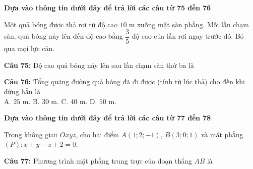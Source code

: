 \documentclass[12pt,a4paper]{article}
\begin{document}


\vspace{0.5cm}
\noindent\textbf{Dựa vào thông tin dưới đây để trả lời các câu từ 75 đến 76}%


\par\nobreak

Một quả bóng được thả rơi từ độ cao $10$ m xuống mặt sàn phẳng. Mỗi lần chạm sàn, quả bóng nảy lên đến độ cao bằng $\dfrac35$ độ cao của lần rơi ngay trước đó. Bỏ qua mọi lực cản.

\par\nobreak


\noindent \textbf{Câu 75:} Độ cao quả bóng nảy lên sau lần chạm sàn thứ ba là\\
\noindent{}



\vspace{0.3cm}

\noindent \textbf{Câu 76:} Tổng quãng đường quả bóng đã đi được (tính từ lúc thả) cho đến khi dừng hẳn là\\
\noindent A. $25$ m. \hfill B. $30$ m. \hfill C. $40$ m. \hfill D. $50$ m.



\vspace{0.5cm}
\noindent\textbf{Dựa vào thông tin dưới đây để trả lời các câu từ 77 đến 78}%


\par\nobreak

Trong không gian $Oxyz$, cho hai điểm $A(1;2;-1)$, $B(3;0;1)$ và mặt phẳng $(P)\colon x+y-z+2=0$.

\par\nobreak


\noindent \textbf{Câu 77:} Phương trình mặt phẳng trung trực của đoạn thẳng $AB$ là\\
\noindent{}\\
\noindent{}
\end{document}
